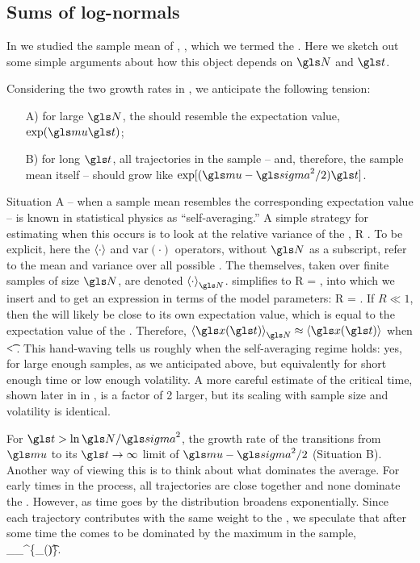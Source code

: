 \subsection{Sums of log-normals}
In \cite{PetersKlein2013} we studied the sample mean of \GBM, , which we termed the \PEA. Here we sketch out some simple arguments about how this object depends on $\N$ and $\t$.

Considering the two growth rates in , we anticipate the following tension:
\begin{enumerate}
\item[A)] for large $\N$, the \PEA should resemble the expectation value, $\exp(\gmu \t)$;
\item[B)] for long $\t$, all trajectories in the sample -- and, therefore, the sample mean itself -- should grow like $\exp[(\gmu-\gsigma^2/2)\t]$.
\end{enumerate}
Situation A -- when a sample mean resembles the corresponding expectation value -- is known in statistical physics as ``self-averaging.'' A simple strategy for estimating when this occurs is to look at the relative variance of the \PEA,
\be
R \equiv {}.
\ee
To be explicit, here the $\left\langle\cdot\right\rangle$ and $\text{var}(\cdot)$ operators, 
without $\N$ as a subscript, 
refer to the mean and variance over all possible \PEAs. The \PEAs themselves, taken over finite samples of size $\N$, are denoted $\ave{\cdot}_\N$.  simplifies to
\be
R = ,
\ee
into which we insert  and  to get an expression in terms of the \GBM model parameters:
\be
R = .
\ee
If $R \ll 1$, then the \PEA will likely be close to its own expectation value, which is equal to the expectation value of the \GBM. Therefore, $\ave{\x(\t)}_\N\approx\ave{\x(\t)}$ when
\be
\t < .
\ee
This hand-waving tells us roughly when the self-averaging regime holds: yes, for large enough samples, as we anticipated above, but equivalently for short enough time or low enough volatility. A more careful estimate of the critical time, shown later in in , is a factor of 2 larger, but its scaling with sample size and volatility is identical.

For $\t>\ln \N/\gsigma^2$, the growth rate of the \PEA transitions from $\gmu$ to its $\t\to\infty$ limit of $\gmu-\gsigma^2/2$ (Situation B). 
Another way of viewing this is to think about what dominates the average. For early times in the process, all trajectories are close together and none dominate the \PEA. However, as time goes by the distribution broadens exponentially. Since each trajectory contributes with the same weight to the \PEA, we speculate that after some time the \PEA comes to be dominated by the maximum in the sample,
\be
\ave{\x(\t)}_\N \approx {}\max_{}^\N \{\x_\gi(\t)\}.
\ee

